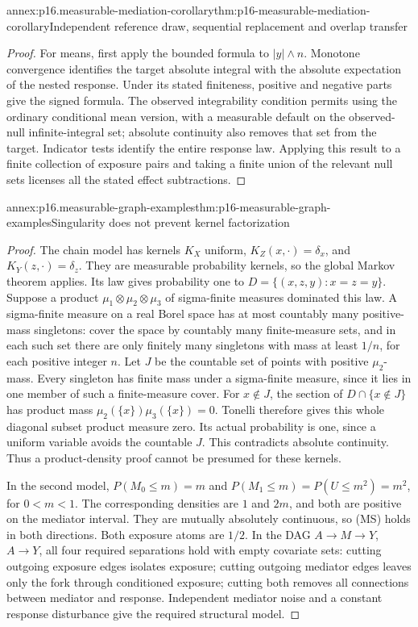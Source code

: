 \begin{annexitem}{annex:p16.measurable-mediation-corollary}{thm:p16-measurable-mediation-corollary}{Independent reference draw, sequential replacement and overlap transfer}
\begin{proof}
For means, first apply the bounded formula to \(|y|\wedge n\).
Monotone convergence identifies the target absolute integral with
the absolute expectation of the nested response. Under its stated
finiteness, positive and negative parts give the signed formula.
The observed integrability condition permits using the ordinary
conditional mean version, with a measurable default on the
observed-null infinite-integral set; absolute continuity also removes
that set from the target. Indicator tests identify the entire response
law. Applying this result to a finite collection of exposure pairs
and taking a finite union of the relevant null sets licenses all
the stated effect subtractions.
\end{proof}
\end{annexitem}

\begin{annexitem}{annex:p16.measurable-graph-examples}{thm:p16-measurable-graph-examples}{Singularity does not prevent kernel factorization}
\begin{proof}
The chain model has kernels \(K_X\) uniform, \(K_Z(x,\cdot)=\delta_x\),
and \(K_Y(z,\cdot)=\delta_z\). They are measurable probability
kernels, so the global Markov theorem applies. Its law gives
probability one to \(D=\{(x,z,y):x=z=y\}\). Suppose a product
\(\mu_1\otimes\mu_2\otimes\mu_3\) of sigma-finite measures
dominated this law. A sigma-finite measure on a real Borel space has
at most countably many positive-mass singletons: cover the space by
countably many finite-measure sets, and in each such set there are
only finitely many singletons with mass at least \(1/n\), for each
positive integer \(n\). Let \(J\) be the countable set of points with
positive \(\mu_2\)-mass. Every singleton has finite mass under a sigma-finite
measure, since it lies in one member of such a finite-measure cover.
For \(x\notin J\), the section of
\(D\cap\{x\notin J\}\) has product mass
\(\mu_2(\{x\})\mu_3(\{x\})=0\). Tonelli therefore gives this
whole diagonal subset product measure zero. Its actual probability
is one, since a uniform variable avoids the countable \(J\).
This contradicts absolute continuity. Thus a product-density proof
cannot be presumed for these kernels.

In the second model, \(P(M_0\leq m)=m\) and
\(P(M_1\leq m)=P(U\leq m^2)=m^2\), for \(0<m<1\).
The corresponding densities are \(1\) and \(2m\), and both
are positive on the mediator interval. They are mutually absolutely
continuous, so (MS) holds in both directions. Both exposure atoms
are \(1/2\). In the DAG \(A\to M\to Y\), \(A\to Y\),
all four required separations hold with empty covariate sets:
cutting outgoing exposure edges isolates exposure; cutting outgoing
mediator edges leaves only the fork through conditioned exposure;
cutting both removes all connections between mediator and response.
Independent mediator noise and a constant response disturbance give
the required structural model.


\end{proof}
\end{annexitem}
